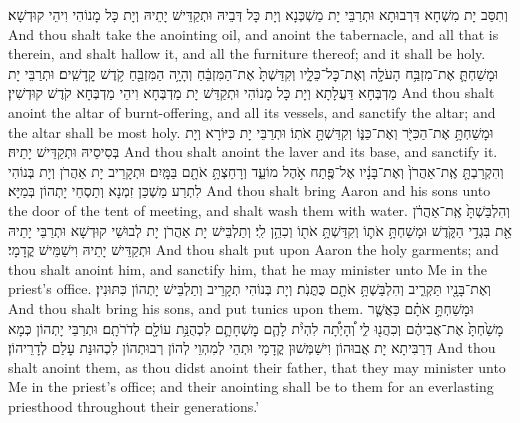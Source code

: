 {{וְתִסַּב יָת מִשְׁחָא דִּרְבוּתָא וּתְרַבֵּי יָת מַשְׁכְּנָא וְיָת כָּל דְּבֵיהּ וּתְקַדֵּישׁ יָתֵיהּ וְיָת כָּל מָנוֹהִי וִיהֵי קוּדְשָׁא׃}
{And thou shalt take the anointing oil, and anoint the tabernacle, and all that is therein, and shalt hallow it, and all the furniture thereof; and it shall be holy.}{}
{וּמָשַׁחְתָּ֛ אֶת־מִזְבַּ֥ח הָעֹלָ֖ה וְאֶת־כׇּל־כֵּלָ֑יו וְקִדַּשְׁתָּ֙ אֶת־הַמִּזְבֵּ֔חַ וְהָיָ֥ה הַמִּזְבֵּ֖חַ קֹ֥דֶשׁ קׇֽדָשִֽׁים׃}
{וּתְרַבֵּי יָת מַדְבְּחָא דַּעֲלָתָא וְיָת כָּל מָנוֹהִי וּתְקַדֵּשׁ יָת מַדְבְּחָא וִיהֵי מַדְבְּחָא קֹדֶשׁ קוּדְשִׁין׃}
{And thou shalt anoint the altar of burnt-offering, and all its vessels, and sanctify the altar; and the altar shall be most holy.}{}
{וּמָשַׁחְתָּ֥ אֶת־הַכִּיֹּ֖ר וְאֶת־כַּנּ֑וֹ וְקִדַּשְׁתָּ֖ אֹתֽוֹ׃}
{וּתְרַבֵּי יָת כִּיּוֹרָא וְיָת בְּסִיסֵיהּ וּתְקַדֵּישׁ יָתֵיהּ׃}
{And thou shalt anoint the laver and its base, and sanctify it.}{}
{וְהִקְרַבְתָּ֤ אֶֽת־אַהֲרֹן֙ וְאֶת־בָּנָ֔יו אֶל־פֶּ֖תַח אֹ֣הֶל מוֹעֵ֑ד וְרָחַצְתָּ֥ אֹתָ֖ם בַּמָּֽיִם׃}
{וּתְקָרֵיב יָת אַהֲרֹן וְיָת בְּנוֹהִי לִתְרַע מַשְׁכַּן זִמְנָא וְתַסְחֵי יָתְהוֹן בְּמַיָּא׃}
{And thou shalt bring Aaron and his sons unto the door of the tent of meeting, and shalt wash them with water.}{}
{וְהִלְבַּשְׁתָּ֙ אֶֽת־אַהֲרֹ֔ן אֵ֖ת בִּגְדֵ֣י הַקֹּ֑דֶשׁ וּמָשַׁחְתָּ֥ אֹת֛וֹ וְקִדַּשְׁתָּ֥ אֹת֖וֹ וְכִהֵ֥ן לִֽי׃}
{וְתַלְבֵּישׁ יָת אַהֲרֹן יָת לְבוּשֵׁי קוּדְשָׁא וּתְרַבֵּי יָתֵיהּ וּתְקַדֵּישׁ יָתֵיהּ וִישַׁמֵּישׁ קֳדָמָי׃}
{And thou shalt put upon Aaron the holy garments; and thou shalt anoint him, and sanctify him, that he may minister unto Me in the priest’s office.}{}
{וְאֶת־בָּנָ֖יו תַּקְרִ֑יב וְהִלְבַּשְׁתָּ֥ אֹתָ֖ם כֻּתֳּנֹֽת׃}
{וְיָת בְּנוֹהִי תְקָרֵיב וְתַלְבֵּישׁ יָתְהוֹן כִּתּוּנִין׃}
{And thou shalt bring his sons, and put tunics upon them.}{}
{וּמָשַׁחְתָּ֣ אֹתָ֗ם כַּאֲשֶׁ֤ר מָשַׁ֙חְתָּ֙ אֶת־אֲבִיהֶ֔ם וְכִהֲנ֖וּ לִ֑י וְ֠הָיְתָ֠ה לִהְיֹ֨ת לָהֶ֧ם מׇשְׁחָתָ֛ם לִכְהֻנַּ֥ת עוֹלָ֖ם לְדֹרֹתָֽם׃}
{וּתְרַבֵּי יָתְהוֹן כְּמָא דְּרַבִּיתָא יָת אֲבוּהוֹן וִישַׁמְּשׁוּן קֳדָמָי וּתְהֵי לְמִהְוֵי לְהוֹן רְבוּתְהוֹן לִכְהוּנַּת עָלַם לְדָרֵיהוֹן׃}
{And thou shalt anoint them, as thou didst anoint their father, that they may minister unto Me in the priest’s office; and their anointing shall be to them for an everlasting priesthood throughout their generations.’}{}
}
